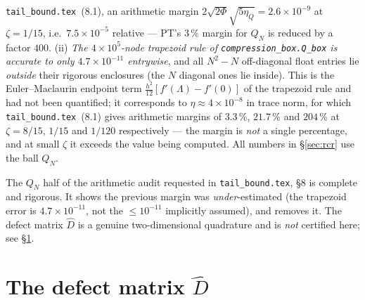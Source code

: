 \documentclass[11pt]{article}
\begin{document}
\texttt{tail\_bound.tex}~(8.1), an arithmetic margin $2\sqrt{2\Phi}\sqrt{5\eta_Q}=2.6\times10^{-9}$ at
$\zeta=1/15$, i.e.\ $7.5\times10^{-5}$ relative --- PT's $3\,\%$ margin for $Q_N$ is reduced by a
factor $400$.  (ii) \emph{The $4\times10^5$-node trapezoid rule of \texttt{compression\_box.Q\_box} is
accurate to only $4.7\times10^{-11}$ entrywise}, and all $N^2-N$ off-diagonal float entries lie
\emph{outside} their rigorous enclosures (the $N$ diagonal ones lie inside).  This is the
Euler--Maclaurin endpoint term $\frac{h^2}{12}[f'(\Lambda)-f'(0)]$ of the trapezoid rule and had not
been quantified; it corresponds to $\eta\approx4\times10^{-8}$ in trace norm, for which
\texttt{tail\_bound.tex}~(8.1) gives arithmetic margins of $3.3\,\%$, $21.7\,\%$ and $204\,\%$ at
$\zeta=8/15$, $1/15$ and $1/120$ respectively --- the margin is \emph{not} a single percentage, and
at small $\zeta$ it exceeds the value being computed.  All numbers in \S\ref{sec:rcr} use the
ball $Q_N$.

\begin{verdictgap}
The $Q_N$ half of the arithmetic audit requested in \texttt{tail\_bound.tex}, \S8 is complete and
rigorous.  It shows the previous margin was \emph{under}-estimated (the trapezoid error is
$4.7\times10^{-11}$, not the $\le10^{-11}$ implicitly assumed), and removes it.  The defect matrix
$\widehat D$ is a genuine two-dimensional quadrature and is \emph{not} certified here; see
\S\ref{sec:dhat}.
\end{verdictgap}

\section{The defect matrix $\widehat D$}\label{sec:dhat}
\end{document}
